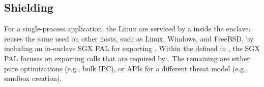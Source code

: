 


\subsection{Shielding \thehostabi{}}
\label{sec:sgx:shield:abi}






For a single-process application,
the Linux \linuxapis{} are serviced by a \libos{}
inside the enclave.
\graphenesgx{} reuses the same \libos{} used on other hosts, such as Linux, Windows, and FreeBSD,
by including an in-enclave SGX PAL for exporting \thehostabi{}.
Within the \palcallnum{} \hostapis{}
defined in \thehostabi{},
the SGX PAL focuses on exporting \sgxpalcallnum{} calls
that are required by \thelibos{}.
The remaining \hostapis{} are
either pure optimizations (e.g., bulk IPC), or APIs for a different threat model (e.g., sandbox creation).







